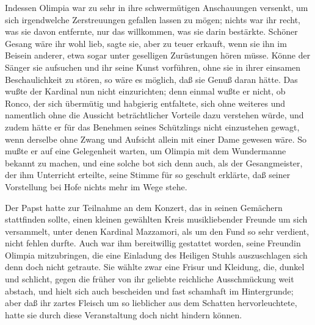Indessen Olimpia war zu sehr in ihre schwermütigen Anschauungen
versenkt, um sich irgendwelche Zerstreuungen gefallen lassen zu
mögen; nichts war ihr recht, was sie davon entfernte, nur das
willkommen, was sie darin bestärkte. Schöner Gesang wäre ihr wohl
lieb, sagte sie, aber zu teuer erkauft, wenn sie ihn im Beisein
anderer, etwa sogar unter geselligen Zurüstungen hören müsse. Könne
der Sänger sie aufsuchen und ihr seine Kunst vorführen, ohne sie in
ihrer einsamen Beschaulichkeit zu stören, so wäre es möglich, daß
sie Genuß daran hätte. Das wußte der Kardinal nun nicht
\pagenum{[83]}einzurichten; denn einmal wußte er nicht, ob Ronco,
der sich übermütig und habgierig entfaltete, sich ohne weiteres und
namentlich ohne die Aussicht beträchtlicher Vorteile dazu verstehen
würde, und zudem hätte er für das Benehmen seines Schützlings nicht
einzustehen gewagt, wenn derselbe ohne Zwang und Aufsicht allein
mit einer Dame gewesen wäre. So mußte er auf eine Gelegenheit
warten, um Olimpia mit dem Wundermanne bekannt zu machen, und eine
solche bot sich denn auch, als der Gesangmeister, der ihm
Unterricht erteilte, seine Stimme für so geschult erklärte, daß
seiner Vorstellung bei Hofe nichts mehr im Wege stehe.

Der Papst hatte zur Teilnahme an dem Konzert, das in seinen
Gemächern stattfinden sollte, einen kleinen gewählten Kreis
musikliebender Freunde um sich versammelt, unter denen Kardinal
Mazzamori, als um den Fund so sehr verdient, nicht fehlen durfte.
Auch war ihm bereitwillig gestattet worden, seine Freundin Olimpia
mitzubringen, die eine Einladung des Heiligen Stuhls auszuschlagen
sich denn doch nicht getraute. Sie wählte zwar eine Frisur und
Kleidung, die, dunkel und schlicht, gegen die früher von ihr
geliebte reichliche Ausschmückung weit abstach, und hielt sich auch
bescheiden und fast schamhaft im Hintergrunde; aber daß ihr zartes
Fleisch um so lieblicher aus dem Schatten hervorleuchtete, hatte
sie durch diese Veranstaltung doch nicht hindern können.

